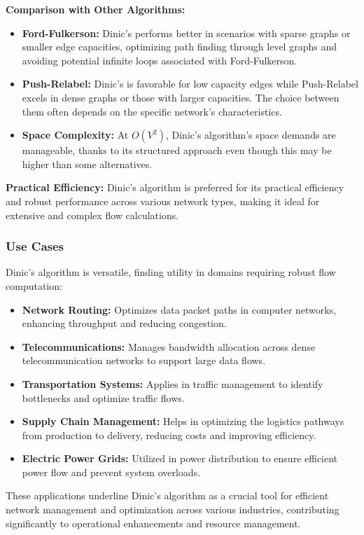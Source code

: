 \documentclass[12pt]{book} %
\begin{document}
\textbf{Comparison with Other Algorithms:}
\begin{itemize}
    \item \textbf{Ford-Fulkerson:} Dinic's performs better in scenarios with sparse graphs or smaller edge capacities, optimizing path finding through level graphs and avoiding potential infinite loops associated with Ford-Fulkerson.
    \item \textbf{Push-Relabel:} Dinic's is favorable for low capacity edges while Push-Relabel excels in dense graphs or those with larger capacities. The choice between them often depends on the specific network's characteristics.
    \item \textbf{Space Complexity:} At \(O(V^2)\), Dinic’s algorithm's space demands are manageable, thanks to its structured approach even though this may be higher than some alternatives.
\end{itemize}

\textbf{Practical Efficiency:}
Dinic’s algorithm is preferred for its practical efficiency and robust performance across various network types, making it ideal for extensive and complex flow calculations.

\subsubsection{Use Cases}
Dinic's algorithm is versatile, finding utility in domains requiring robust flow computation:

\begin{itemize}
    \item \textbf{Network Routing:} Optimizes data packet paths in computer networks, enhancing throughput and reducing congestion.
    \item \textbf{Telecommunications:} Manages bandwidth allocation across dense telecommunication networks to support large data flows.
    \item \textbf{Transportation Systems:} Applies in traffic management to identify bottlenecks and optimize traffic flows.
    \item \textbf{Supply Chain Management:} Helps in optimizing the logistics pathways from production to delivery, reducing costs and improving efficiency.
    \item \textbf{Electric Power Grids:} Utilized in power distribution to ensure efficient power flow and prevent system overloads.
\end{itemize}

These applications underline Dinic's algorithm as a crucial tool for efficient network management and optimization across various industries, contributing significantly to operational enhancements and resource management.
\end{document}
